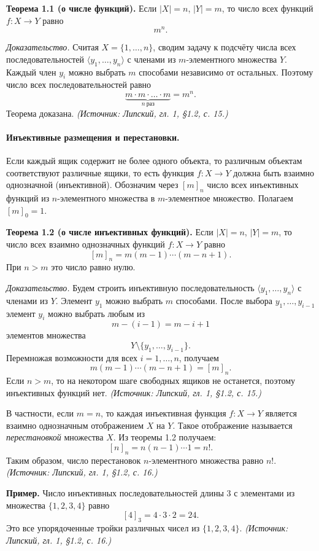 \documentclass[a4paper,12pt]{article}
\begin{document}
\textbf{Теорема 1.1 (о числе функций).} Если \(|X|=n\), \(|Y|=m\), то число всех функций \(f:X\to Y\) равно
\[
m^n.
\]

\emph{Доказательство.} Считая \(X=\{1,\dots,n\}\), сводим задачу к подсчёту числа всех последовательностей \(\langle y_1,\dots,y_n\rangle\) с членами из \(m\)-элементного множества \(Y\). Каждый член \(y_i\) можно выбрать \(m\) способами независимо от остальных. Поэтому число всех последовательностей равно
\[
\underbrace{m\cdot m\cdot\ldots\cdot m}_{n\ \text{раз}}=m^n.
\]
Теорема доказана.
\textit{(Источник: Липский, гл. 1, §1.2, с. 15.)}

\paragraph{Инъективные размещения и перестановки.}
Если каждый ящик содержит не более одного объекта, то различным объектам соответствуют различные ящики, то есть функция \(f:X\to Y\) должна быть взаимно однозначной (инъективной). Обозначим через \([m]_n\) число всех инъективных функций из \(n\)-элементного множества в \(m\)-элементное множество. Полагаем \([m]_0=1\).

\textbf{Теорема 1.2 (о числе инъективных функций).} Если \(|X|=n\), \(|Y|=m\), то число всех взаимно однозначных функций \(f:X\to Y\) равно
\[
[m]_n=m(m-1)\cdots(m-n+1).
\]
При \(n>m\) это число равно нулю.

\emph{Доказательство.} Будем строить инъективную последовательность \(\langle y_1,\dots,y_n\rangle\) с членами из \(Y\). Элемент \(y_1\) можно выбрать \(m\) способами. После выбора \(y_1,\dots,y_{i-1}\) элемент \(y_i\) можно выбрать любым из
\[
m-(i-1)=m-i+1
\]
элементов множества
\[
Y\setminus\{y_1,\dots,y_{i-1}\}.
\]
Перемножая возможности для всех \(i=1,\dots,n\), получаем
\[
m(m-1)\cdots(m-n+1)=[m]_n.
\]
Если \(n>m\), то на некотором шаге свободных ящиков не останется, поэтому инъективных функций нет.
\textit{(Источник: Липский, гл. 1, §1.2, с. 15.)}

В частности, если \(m=n\), то каждая инъективная функция \(f:X\to Y\) является взаимно однозначным отображением \(X\) на \(Y\). Такое отображение называется \emph{перестановкой} множества \(X\). Из теоремы 1.2 получаем:
\[
[n]_n=n(n-1)\cdots1=n!.
\]
Таким образом, число перестановок \(n\)-элементного множества равно \(n!\).
\textit{(Источник: Липский, гл. 1, §1.2, с. 16.)}

\textbf{Пример.} Число инъективных последовательностей длины \(3\) с элементами из множества \(\{1,2,3,4\}\) равно
\[
[4]_3=4\cdot3\cdot2=24.
\]
Это все упорядоченные тройки различных чисел из \(\{1,2,3,4\}\).
\textit{(Источник: Липский, гл. 1, §1.2, с. 16.)}
\end{document}
